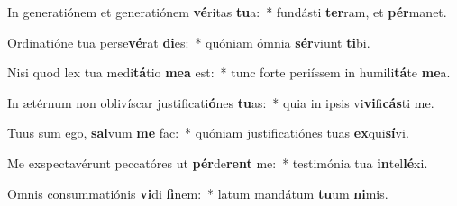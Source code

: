 \item In generatiónem et generatiónem \textbf{vé}ritas \textbf{tu}a:~* fundásti \textbf{ter}ram, et \textbf{pér}manet.
\item Ordinatióne tua perse\textbf{vé}rat \textbf{di}es:~* quóniam ómnia \textbf{sér}viunt \textbf{ti}bi.
\item Nisi quod lex tua medi\textbf{tá}tio \textbf{me}\textbf{a} est:~* tunc forte periíssem in humili\textbf{tá}te \textbf{me}a.
\item In ætérnum non oblivíscar justificati\textbf{ó}nes \textbf{tu}as:~* quia in ipsis vi\textbf{vi}fi\textbf{cás}ti me.
\item Tuus sum ego, \textbf{sal}vum \textbf{me} fac:~* quóniam justificatiónes tuas \textbf{ex}qui\textbf{sí}vi.
\item Me exspectavérunt peccatóres ut \textbf{pér}de\textbf{rent} me:~* testimónia tua \textbf{in}tel\textbf{lé}xi.
\item Omnis consummatiónis \textbf{vi}di \textbf{fi}nem:~* latum mandátum \textbf{tu}um \textbf{ni}mis.
